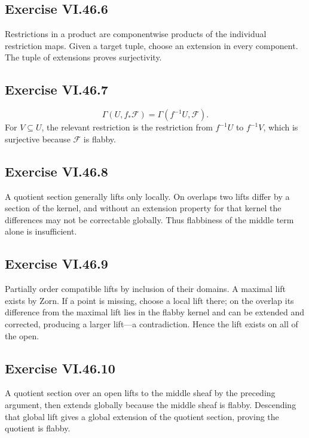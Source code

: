 \subsection*{Exercise VI.46.6}
\begin{solution}
Restrictions in a product are componentwise products of the individual restriction maps.  Given a target tuple, choose an extension in every component.  The tuple of extensions proves surjectivity.
\end{solution}

\subsection*{Exercise VI.46.7}
\begin{solution}
\[
\Gamma(U,f_*\mathcal F)=\Gamma(f^{-1}U,\mathcal F).
\]
For \(V\subseteq U\), the relevant restriction is the restriction from \(f^{-1}U\) to \(f^{-1}V\), which is surjective because \(\mathcal F\) is flabby.
\end{solution}

\subsection*{Exercise VI.46.8}
\begin{solution}
A quotient section generally lifts only locally.  On overlaps two lifts differ by a section of the kernel, and without an extension property for that kernel the differences may not be correctable globally.  Thus flabbiness of the middle term alone is insufficient.
\end{solution}

\subsection*{Exercise VI.46.9}
\begin{solution}
Partially order compatible lifts by inclusion of their domains.  A maximal lift exists by Zorn.  If a point is missing, choose a local lift there; on the overlap its difference from the maximal lift lies in the flabby kernel and can be extended and corrected, producing a larger lift—a contradiction.  Hence the lift exists on all of the open.
\end{solution}

\subsection*{Exercise VI.46.10}
\begin{solution}
A quotient section over an open lifts to the middle sheaf by the preceding argument, then extends globally because the middle sheaf is flabby.  Descending that global lift gives a global extension of the quotient section, proving the quotient is flabby.
\end{solution}

